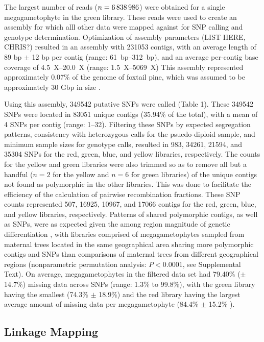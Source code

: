 \documentclass[smallextended]{svjour3}
\begin{document}
The largest number of reads ($n=\text{\num{6838986}}$) were obtained for a single megagametophyte in the 
green library. These reads were used to create an assembly for which alll other data were mapped against 
for SNP calling and genotype determination. Optimization of assembly parameters (LIST HERE, CHRIS?) 
resulted in an assembly with \num{231053} contigs, with an average length of 89 bp $\pm$ 12 bp per contig 
(range: \SIrange {61}{312}{bp}), and an average per-contig base coverage of \SIrange{4.5}{20.0}{X} (range: 
\SIrange{1.5}{5069}{X})
This assembly represented approximately 0.07\% of the genome of foxtail
pine, which was assumed to be approximately 30 Gbp in size \citep{Murray:1998}.

Using this assembly, \num{349542} putative SNPs were called (Table 1). These  \num{349542} SNPs were located in
\num{83051} unique contigs (35.94\% of the total), with a mean of \num{4} SNPs per contig (range: \SIrange{1}{32}{}). Filtering these SNPs by
expected segregation patterns, consistency with heterozygous calls for the psuedo-diploid sample, and minimum
sample sizes for genotype calls, resulted in \num{983}, \num{34261}, \num{21594}, and \num{35304} SNPs for the red, green, blue, 
and yellow libraries, respectively. The counts for the yellow and green libraries were also trimmed so as to remove
all but a handful ($n = 2$ for the yellow and $n = 6$ for green libraries) of the unique contigs not found as polymorphic in the 
other libraries. This was done to facilitate the efficiency of the calculation of pairwise
recombination fractions. These SNP counts represented \num{507}, \num{16925}, \num{10967}, and \num{17066} contigs
for the red, green, blue, and yellow libraries, respectively. Patterns of shared polymorphic contigs, as well as
SNPs, were as expected given the among region magnitude of genetic differentiation \citep[Figure 2, see][]{Eckert:2008}, 
with libraries comprised of megagametophytes sampled from maternal trees located in 
the same geographical area sharing more polymorphic contigs and SNPs than comparisons of maternal trees from different
geographical regions (nonparametric permutation analysis: $P < 0.0001$, see Supplemental Text).
On average, megagametophytes in the filtered data set had 79.40\% ($\pm$ 14.7\%) missing data 
across SNPs (range: 1.3\% to 99.8\%), with the green library having the smallest (74.3\% $\pm$ 18.9\%) and the red library having
the largest average amount of missing data per megagametophyte (84.4\% $\pm$ 15.2\% ).

\subsection*{Linkage Mapping}
\end{document}
